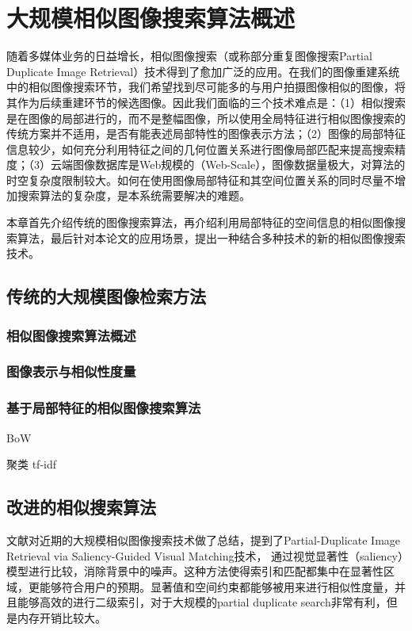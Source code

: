 

\chapter{大规模相似图像搜索算法概述}

随着多媒体业务的日益增长，相似图像搜索（或称部分重复图像搜索Partial Duplicate Image Retrieval）技术得到了愈加广泛的应用。在我们的图像重建系统中的相似图像搜索环节，我们希望找到尽可能多的与用户拍摄图像相似的图像，将其作为后续重建环节的候选图像。因此我们面临的三个技术难点是：（1）相似搜索是在图像的局部进行的，而不是整幅图像，所以使用全局特征进行相似图像搜索的传统方案并不适用，是否有能表述局部特性的图像表示方法；（2）图像的局部特征信息较少，如何充分利用特征之间的几何位置关系进行图像局部匹配来提高搜索精度；（3）云端图像数据库是Web规模的（Web-Scale），图像数据量极大，对算法的时空复杂度限制较大。如何在使用图像局部特征和其空间位置关系的同时尽量不增加搜索算法的复杂度，是本系统需要解决的难题。

本章首先介绍传统的图像搜索算法，再介绍利用局部特征的空间信息的相似图像搜索算法，最后针对本论文的应用场景，提出一种结合多种技术的新的相似图像搜索技术。

\section{传统的大规模图像检索方法}

\subsection{相似图像搜索算法概述}

\subsection{图像表示与相似性度量}

\subsection{基于局部特征的相似图像搜索算法}
BoW

聚类
tf-idf


\section{改进的相似搜索算法}
文献\cite{POLICY:2013te}对近期的大规模相似图像搜索技术做了总结，提到了Partial-Duplicate Image Retrieval via Saliency-Guided Visual Matching\cite{Li:2013ks}技术，
通过视觉显著性（saliency）模型进行比较，消除背景中的噪声。这种方法使得索引和匹配都集中在显著性区域，更能够符合用户的预期。显著值和空间约束都能够被用来进行相似性度量，并且能够高效的进行二级索引，对于大规模的partial duplicate search非常有利，但是内存开销比较大。

